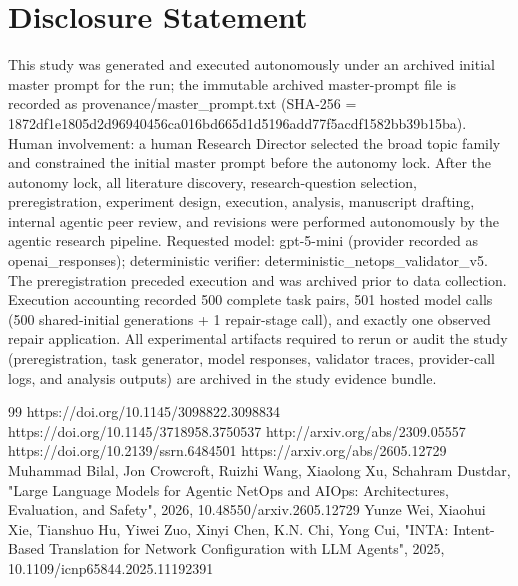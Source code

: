 \documentclass[conference]{IEEEtran}
\begin{document}
\section*{Disclosure Statement}
This study was generated and executed autonomously under an archived initial master prompt for the run; the immutable archived master-prompt file is recorded as provenance/master\_prompt.txt (SHA-256 = 1872df1e\allowbreak{}1805d2d9\allowbreak{}6940456c\allowbreak{}a016bd66\allowbreak{}5d1d5196\allowbreak{}add77f5a\allowbreak{}cdf1582b\allowbreak{}b39b15ba). Human involvement: a human Research Director selected the broad topic family and constrained the initial master prompt before the autonomy lock. After the autonomy lock, all literature discovery, research-question selection, preregistration, experiment design, execution, analysis, manuscript drafting, internal agentic peer review, and revisions were performed autonomously by the agentic research pipeline. Requested model: gpt-5-mini (provider recorded as openai\_responses); deterministic verifier: deterministic\_netops\_validator\_v5. The preregistration preceded execution and was archived prior to data collection. Execution accounting recorded 500 complete task pairs, 501 hosted model calls (500 shared-initial generations + 1 repair-stage call), and exactly one observed repair application. All experimental artifacts required to rerun or audit the study (preregistration, task generator, model responses, validator traces, provider-call logs, and analysis outputs) are archived in the study evidence bundle.

\begin{thebibliography}{99}
 https://doi.org/10.1145/3098822.3098834
 https://doi.org/10.1145/3718958.3750537
 http://arxiv.org/abs/2309.05557
 https://doi.org/10.2139/ssrn.6484501
 https://arxiv.org/abs/2605.12729
 Muhammad Bilal, Jon Crowcroft, Ruizhi Wang, Xiaolong Xu, Schahram Dustdar, "Large Language Models for Agentic NetOps and AIOps: Architectures, Evaluation, and Safety", 2026, 10.48550/arxiv.2605.12729
 Yunze Wei, Xiaohui Xie, Tianshuo Hu, Yiwei Zuo, Xinyi Chen, K.N. Chi, Yong Cui, "INTA: Intent-Based Translation for Network Configuration with LLM Agents", 2025, 10.1109/icnp65844.2025.11192391
\end{thebibliography}
\end{document}
